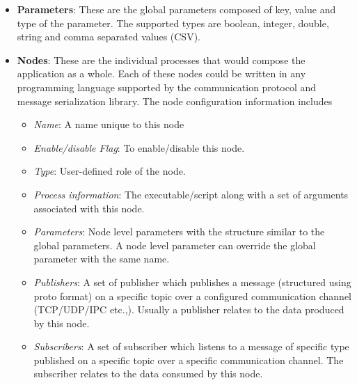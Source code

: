 \begin{itemize}[leftmargin={0.5cm},topsep={0pt},itemsep={0pt},partopsep={0pt},parsep={0pt}]
\item \textbf{Parameters}: These are the global parameters composed of key, value and type of the parameter. The supported types are boolean, integer, double, string and comma separated values (CSV). 
\item \textbf{Nodes}: These are the individual processes that would compose the application as a whole. Each of these nodes could be written in any programming language supported by the communication protocol and message serialization library. The node configuration information includes
\begin{itemize}
\item \emph{Name}: A name unique to this node
\item \emph{Enable/disable Flag}: To enable/disable this node.
\item \emph{Type}: User-defined role of the node.
\item \emph{Process information}: The executable/script along with a set of arguments associated with this node.
\item \emph{Parameters}: Node level parameters with the structure similar to the global parameters. A node level parameter can override the global parameter with the same name.
\item \emph{Publishers}: A set of publisher which publishes a message (structured using proto format) on a specific topic over a configured communication channel (TCP/UDP/IPC etc.,). Usually a publisher relates to the data produced by this node.
\item \emph{Subscribers}: A set of subscriber which listens to a message of specific type published on a specific topic over a specific communication channel. The subscriber relates to the data consumed by this node.
\end{itemize}
\end{itemize}
